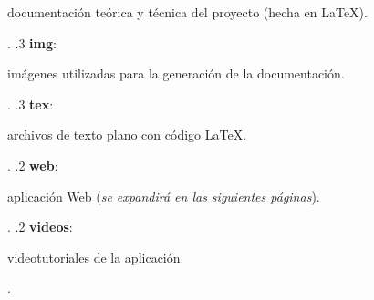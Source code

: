 \begin{figure}[H]
{\begin{minipage}[t]{8cm}
            documentación teórica y técnica del proyecto (hecha en \LaTeX){.}\\
        \end{minipage}.
        .3 \textbf{img}: \begin{minipage}[t]{8cm}
            imágenes utilizadas para la generación de la documentación{.}\\
        \end{minipage}.
        .3 \textbf{tex}: \begin{minipage}[t]{8cm}
            archivos de texto plano con código \LaTeX{.}\\
        \end{minipage}.
        .2 \textbf{web}: \begin{minipage}[t]{8cm}
            aplicación Web (\emph{se expandirá en las siguientes páginas}){.}\\
        \end{minipage}.
        .2 \textbf{videos}: \begin{minipage}[t]{10cm}
            videotutoriales de la aplicación{.}\\
        \end{minipage}. 
    }
\end{figure}

